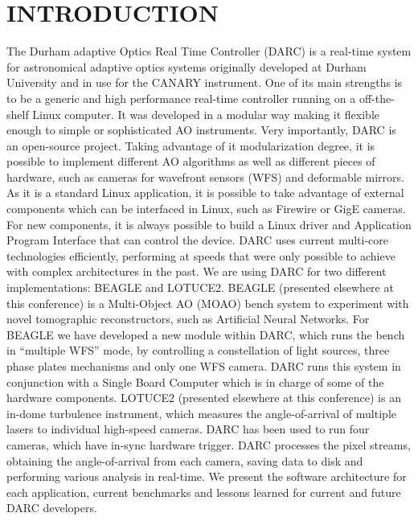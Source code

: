 \documentclass[]{spie}  %
\begin{document}
\section{INTRODUCTION}
\label{sec:intro}  %
The Durham adaptive Optics Real Time Controller (DARC) is a real-time system
for astronomical adaptive optics systems originally developed at Durham
University and in use for the CANARY instrument. One of its main strengths is
to be a generic and high performance real-time controller running on a
off-the-shelf Linux computer. It was developed in a modular way making it
flexible enough to simple or sophisticated AO instruments. Very importantly,
DARC is an open-source project. Taking advantage of it modularization degree,
it is possible to implement different AO algorithms as well as different pieces
of hardware, such as cameras for wavefront sensors (WFS) and deformable
mirrors. As it is a standard Linux application, it is possible to take
advantage of external components which can be interfaced in Linux, such as
Firewire or GigE cameras. For new components, it is always possible to build a
Linux driver and Application Program Interface that can control the device.
DARC uses current multi-core technologies efficiently, performing at speeds
that were only possible to achieve with complex architectures in the past\cite{basden2012durham}. 
We are using DARC for two different implementations: BEAGLE and LOTUCE2. BEAGLE
(presented elsewhere at this conference) is a Multi-Object AO (MOAO) bench
system to experiment with novel tomographic reconstructors, such as Artificial
Neural Networks. For BEAGLE we have developed a new module within DARC, which
runs the bench in ``multiple WFS'' mode, by controlling a constellation of light
sources, three phase plates mechanisms and only one WFS camera. DARC runs this
system in conjunction with a Single Board Computer which is in charge of some
of the hardware components. LOTUCE2 (presented elsewhere at this conference) is
an in-dome turbulence instrument, which measures the angle-of-arrival of
multiple lasers to individual high-speed cameras. DARC has been used to run
four cameras, which have in-sync hardware trigger. DARC processes the pixel
streams, obtaining the angle-of-arrival from each camera, saving data to disk
and performing various analysis in real-time. We present the software
architecture for each application, current benchmarks and lessons learned for
current and future DARC developers.
\end{document}
